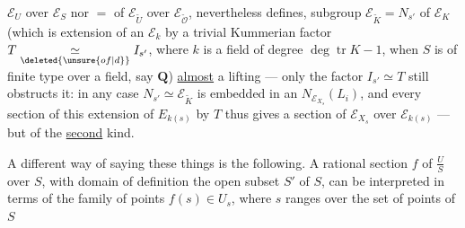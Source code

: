 $\mathcal E_U$ over $\mathcal E_S$ nor $=$ of $\mathcal E_{\widetilde U}$ over $\mathcal E_{\widetilde{\mathcal O}}$, nevertheless defines,   subgroup $\mathcal E_{\widetilde K}=N_{s'}$ of $\mathcal E_K$ (which is extension of an $\mathcal E_k$ by a trivial Kummerian factor $T\underset{\deleted{\unsure{of|d}}}{\simeq}I_{s'}$, where $k$ is a field of  degree $\deg\operatorname{tr}K-1$, when $S$ is of finite type over a  field, say $\mathbf Q$) \uline{almost} a lifting --- only the factor $I_{s'}\simeq T$ still obstructs it: in any case $N_{s'}\simeq\mathcal E_{\widetilde K}$ is embedded in an $N_{\mathcal E_{X_s}}(L_i)$, and every section of this extension of $E_{k(s)}$ by $T$ thus gives a section of $\mathcal E_{X_s}$ over $\mathcal E_{k(s)}$ --- but of the \uline{second} kind.

A  different way of saying these things is the following. A rational section $f$ of $\frac{U}{S}$ over $S$, with domain of definition the open subset $S'$ of $S$,  can be interpreted in terms of the family of points $f(s)\in U_s$, where $s$ ranges over the set of points of $S$
